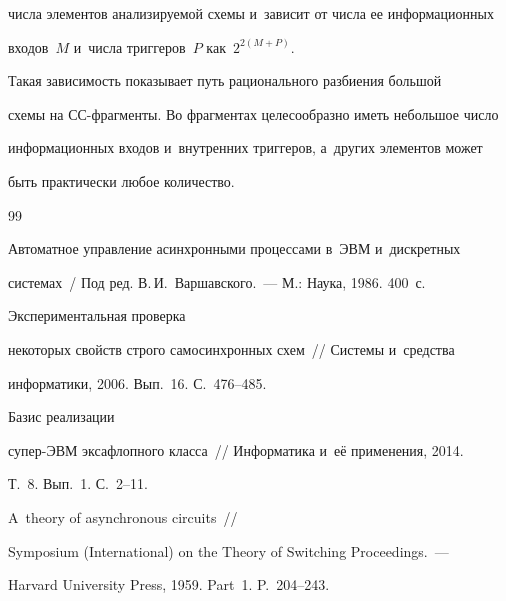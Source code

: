 числа элементов анализируемой схемы и~зависит от числа ее информационных 


входов~$M$ и~числа триггеров~$P$ как~$2^{2(M+P)}$.


   


   Такая зависимость показывает путь рационального разбиения большой 


схемы на СС-фрагменты. Во фрагментах целесообразно иметь небольшое число 


информационных входов и~внутренних триггеров, а~других элементов может 


быть практически любое количество.


   


{\small\frenchspacing


{%




\begin{thebibliography}{99}




Автоматное управление асинхронными процессами в~ЭВМ и~дискретных 


системах~/ Под ред. В.\,И.~Варшавского.~--- М.: Наука, 1986. 400~с.




 Экспериментальная проверка 


некоторых свойств строго самосинхронных схем~/\!\!/ Системы и~средства 


информатики, 2006. Вып.~16. С.~476--485.




 Базис реализации 


супер-ЭВМ эксафлопного класса~/\!\!/ Информатика и~её применения, 2014. 


Т.~8. Вып.~1. С.~2--11. 




 A~theory of asynchronous circuits~/\!\!/ 


Symposium (International) on the Theory of Switching Proceedings.~--- 


Harvard University Press, 1959.  Part~1. P.~204--243.




\end{thebibliography}}}
